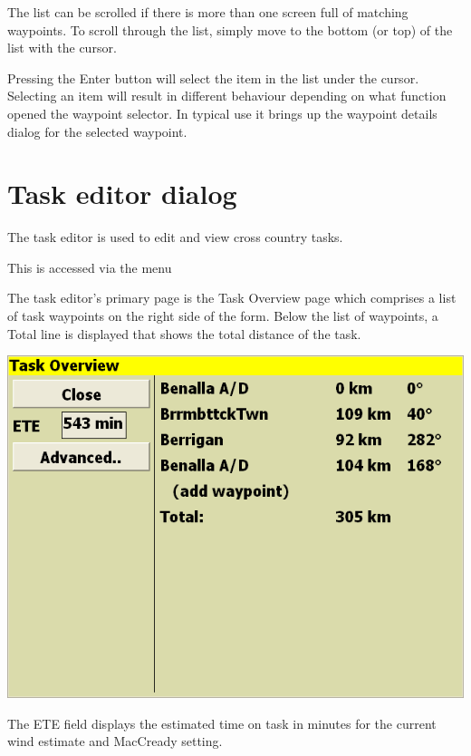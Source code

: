 \documentclass[a4paper,12pt]{refrep}
\begin{document}
The list can be scrolled if there is more than one screen full of
matching waypoints.  To scroll through the list, simply move to the
bottom (or top) of the list with the cursor.  

Pressing the Enter button will select the item in the list under the
cursor.  Selecting an item will result in different behaviour
depending on what function opened the waypoint selector.  In typical
use it brings up the waypoint details dialog for the selected
waypoint.

\section{Task editor dialog}\label{sec:task-editor-dialog}
The task editor is used to edit and view cross country tasks.

This is accessed via the menu
\begin{quote}
\blink{}
\end{quote} 

The task editor's primary page is the Task Overview page which
comprises a list of task waypoints on the right side of the form.
Below the list of waypoints, a Total line is displayed that shows
the total distance of the task.
\begin{center}
\includegraphics[angle=0,width=\linewidth,keepaspectratio='true']{figures/dialog-taskedit0.png}
\end{center}
The ETE field displays the estimated time on task in minutes for the
current wind estimate and MacCready setting.
\end{document}
